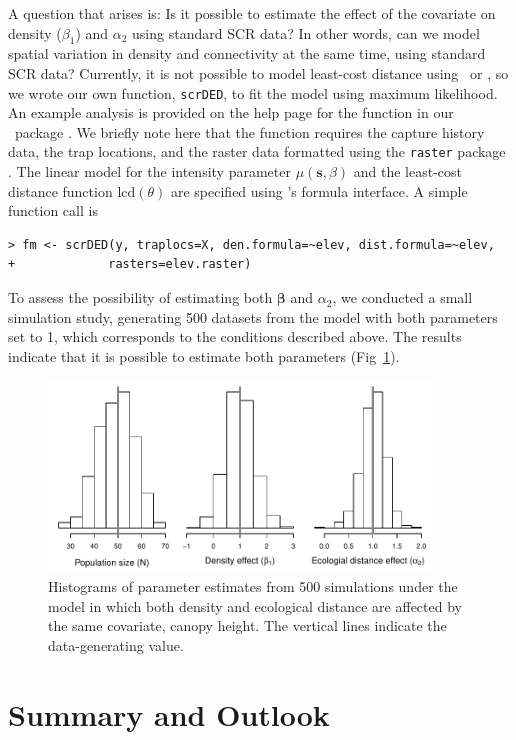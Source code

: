 A question that arises is: Is it possible to estimate the effect of
the covariate on density ($\beta_1$)
and $\alpha_2$ using standard SCR data? In other words, can we model
spatial variation in density and connectivity at the same time,
using standard SCR data? Currently, it is not possible to
model least-cost distance using \jags~or \secr, so we wrote our own
function, \verb+scrDED+, to fit the model using maximum likelihood. An
example analysis is provided on the help page for the function in our
\R~package \scrbook. We briefly note here that the function requires
the capture history data, the trap locations, and the raster data
formatted using the {\tt raster} package
\citep{hijmans_vanetten:2012}. The linear model for the
intensity parameter $\mu(\mathbf{s}, \beta)$ and the least-cost distance
function $\text{lcd}(\theta)$ are specified using \R's formula interface. A
simple function call is
\begin{verbatim}
> fm <- scrDED(y, traplocs=X, den.formula=~elev, dist.formula=~elev,
+             rasters=elev.raster)
\end{verbatim}
To assess the possibility of estimating both $\bm \beta$ and $\alpha_2$, we
conducted a small simulation study, generating 500 datasets from the
model with both parameters set to 1, which corresponds to the
conditions described above. The results indicate that it is
possible to estimate both parameters
(Fig~\ref{chapt.ecoldist.fig.simDED}).

\begin{figure}[ht]
\centering
\includegraphics[width=4in,height=2in]{Ch12-EcolDist/figs/scrDEDsim}
\caption{Histograms of parameter estimates from 500 simulations under
  the model in which both density and ecological distance are affected
by the same covariate, canopy height. The vertical lines indicate the
data-generating value.}
\label{chapt.ecoldist.fig.simDED}
\end{figure}



\section{Summary and Outlook}


